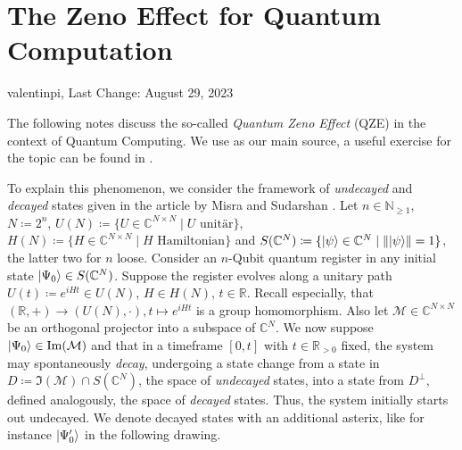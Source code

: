 \documentclass[10pt]{amsart}
\theoremstyle{definition}
\theoremstyle{remark}
\begin{document}
    \section*{The Zeno Effect for Quantum Computation} \hfill valentinpi, Last Change: August 29, 2023

    The following notes discuss the so-called \emph{Quantum Zeno Effect} (QZE) in the context of Quantum Computing. We use \cite{Misra_1977} as our main source, a useful exercise for the topic can be found in \cite[pp. 442-443]{Griffiths}.

    To explain this phenomenon, we consider the framework of \emph{undecayed} and \emph{decayed} states given in the article by Misra and Sudarshan \cite[p. 756]{Misra_1977}. Let \(n \in \mathbb{N}_{\geq 1}\), \(N \coloneqq 2^n\), \(U(N) \coloneqq \{U \in \mathbb{C}^{N \times N} \mid U \text{ unitär}\}\), \(H(N) \coloneqq \{H \in \mathbb{C}^{N \times N} \mid H \text{ Hamiltonian}\}\) and \(S(\mathbb{C}^N) \coloneqq \{\ket{\psi} \in \mathbb{C}^N \mid \norm{\ket{\psi}} = 1\}\), the latter two for \(n\) loose. Consider an \(n\)-Qubit quantum register in any initial state \(\ket{\Psi_0} \in S(\mathbb{C}^N)\). Suppose the register evolves along a unitary path \(U(t) \coloneqq e^{iHt} \in U(N)\), \(H \in H(N)\), \(t \in \mathbb{R}\). Recall especially, that \((\mathbb{R}, +) \to (U(N), \cdot), t \mapsto e^{iHt}\) is a group homomorphism. Also let \(\mathcal{M} \in \mathbb{C}^{N \times N}\) be an orthogonal projector into a subspace of \(\mathbb{C}^N\). We now suppose \(\ket{\Psi_0} \in \Im(\mathcal{M})\) and that in a timeframe \([0, t]\) with \(t \in \mathbb{R}_{> 0}\) fixed, the system may spontaneously \emph{decay}, undergoing a state change from a state in \(D \coloneqq \Im(\mathcal{M}) \cap S(\mathbb{C}^N)\), the space of \emph{undecayed} states, into a state from \(D^\perp\), defined analogously, the space of \emph{decayed} states. Thus, the system initially starts out undecayed. We denote decayed states with an additional asterix, like for instance \(\ket{\Psi_0'}\) in the following drawing.
\end{document}
